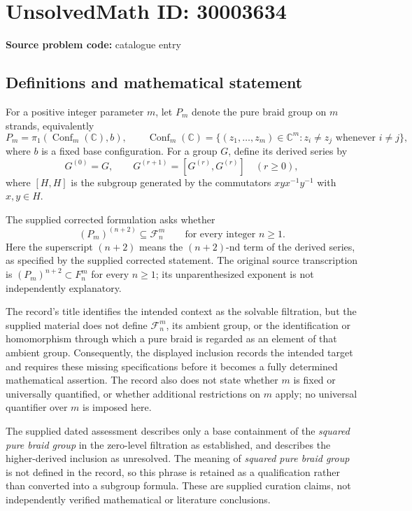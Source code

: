 \documentclass[11pt]{article}
\newcommand{\C}{\mathbb{C}}
\begin{document}
\section*{UnsolvedMath ID: 30003634}
\textbf{Source problem code:} catalogue entry
\subsection{Definitions and mathematical statement}
For a positive integer parameter \(m\), let \(P_m\) denote the pure braid group on \(m\) strands, equivalently
\[
P_m=\pi_1\!\left(\operatorname{Conf}_m(\C),b\right),\qquad
\operatorname{Conf}_m(\C)=\{(z_1,\ldots,z_m)\in\C^m:z_i\ne z_j\text{ whenever }i\ne j\},
\]
where \(b\) is a fixed base configuration. For a group \(G\), define its derived series by
\[
G^{(0)}=G,\qquad G^{(r+1)}=[G^{(r)},G^{(r)}]\quad(r\geq0),
\]
where \([H,H]\) is the subgroup generated by the commutators \(xyx^{-1}y^{-1}\) with \(x,y\in H\).

The supplied corrected formulation asks whether
\[
(P_m)^{(n+2)}\subseteq\mathcal F_n^m
\qquad\text{for every integer }n\geq1.
\]
Here the superscript \((n+2)\) means the \((n+2)\)-nd term of the derived series, as specified by the supplied corrected statement. The original source transcription is \( (P_m)^{n+2}\subset F_n^m\) for every \(n\geq1\); its unparenthesized exponent is not independently explanatory.

The record's title identifies the intended context as the solvable filtration, but the supplied material does not define \(\mathcal F_n^m\), its ambient group, or the identification or homomorphism through which a pure braid is regarded as an element of that ambient group. Consequently, the displayed inclusion records the intended target and requires these missing specifications before it becomes a fully determined mathematical assertion. The record also does not state whether \(m\) is fixed or universally quantified, or whether additional restrictions on \(m\) apply; no universal quantifier over \(m\) is imposed here.

The supplied dated assessment describes only a base containment of the \emph{squared pure braid group} in the zero-level filtration as established, and describes the higher-derived inclusion as unresolved. The meaning of \emph{squared pure braid group} is not defined in the record, so this phrase is retained as a qualification rather than converted into a subgroup formula. These are supplied curation claims, not independently verified mathematical or literature conclusions.
\end{document}
